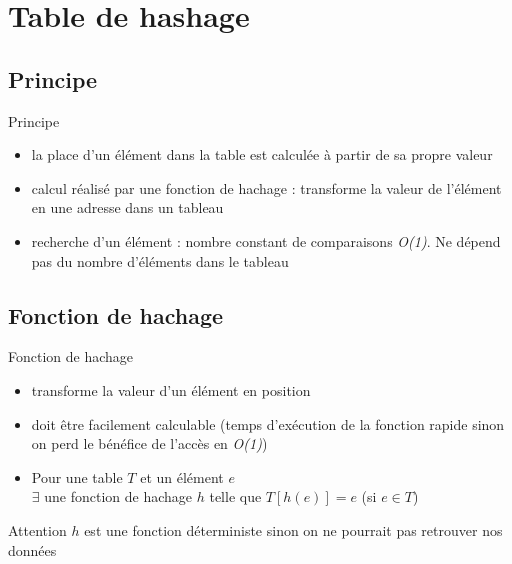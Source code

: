 \documentclass{beamer}
\begin{document}

  \section{Table de hashage}
  \subsection{Principe}
  \begin{frame}{Principe}
    \begin{itemize}
      \item{la place d’un élément dans la table est calculée à partir de sa propre valeur}
      \item{calcul réalisé par une fonction de hachage : transforme la valeur de l’élément en une adresse dans un tableau}
      \item{recherche d’un élément : nombre constant de comparaisons \textit{O(1)}. Ne dépend pas du nombre d’éléments dans le tableau}
    \end{itemize}
  \end{frame}

  \subsection{Fonction de hachage}
  \begin{frame}{Fonction de hachage}
    \begin{itemize}
      \item{transforme la valeur d’un élément en position}
      \item{doit être facilement calculable (temps d’exécution de la fonction rapide sinon on perd le bénéfice de l’accès en \textit{O(1)})}
      \item{Pour une table $T$ et un élément $e$\\ $\exists$ une fonction de hachage $h$ telle que $T[h(e)] = e$ (si $e \in T$)}
    \end{itemize}

    \begin{block}{Attention}
      $h$ est une fonction déterministe sinon on ne pourrait
      pas retrouver nos données
    \end{block}
  \end{frame}
\end{document}
